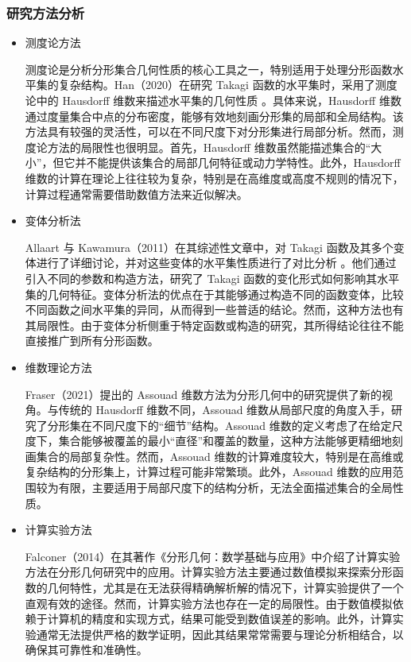 \subsubsection{研究方法分析}
\begin{itemize}


\item 测度论方法

测度论是分析分形集合几何性质的核心工具之一，特别适用于处理分形函数水平集的复杂结构。Han（2020）在研究 Takagi 函数的水平集时，采用了测度论中的 Hausdorff 维数来描述水平集的几何性质 \cite{1}。具体来说，Hausdorff 维数通过度量集合中点的分布密度，能够有效地刻画分形集的局部和全局结构。该方法具有较强的灵活性，可以在不同尺度下对分形集进行局部分析。然而，测度论方法的局限性也很明显。首先，Hausdorff 维数虽然能描述集合的“大小”，但它并不能提供该集合的局部几何特征或动力学特性。此外，Hausdorff 维数的计算在理论上往往较为复杂，特别是在高维度或高度不规则的情况下，计算过程通常需要借助数值方法来近似解决。
\item 变体分析法

Allaart 与 Kawamura（2011）在其综述性文章中，对 Takagi 函数及其多个变体进行了详细讨论，并对这些变体的水平集性质进行了对比分析 \cite{2}。他们通过引入不同的参数和构造方法，研究了 Takagi 函数的变化形式如何影响其水平集的几何特征。变体分析法的优点在于其能够通过构造不同的函数变体，比较不同函数之间水平集的异同，从而得到一些普适的结论。然而，这种方法也有其局限性。由于变体分析侧重于特定函数或构造的研究，其所得结论往往不能直接推广到所有分形函数。
\item 维数理论方法

Fraser（2021）提出的 Assouad 维数方法为分形几何中的研究提供了新的视角\cite{3}。与传统的 Hausdorff 维数不同，Assouad 维数从局部尺度的角度入手，研究了分形集在不同尺度下的“细节”结构。Assouad 维数的定义考虑了在给定尺度下，集合能够被覆盖的最小“直径”和覆盖的数量，这种方法能够更精细地刻画集合的局部复杂性。然而，Assouad 维数的计算难度较大，特别是在高维或复杂结构的分形集上，计算过程可能非常繁琐。此外，Assouad 维数的应用范围较为有限，主要适用于局部尺度下的结构分析，无法全面描述集合的全局性质。
\item 计算实验方法

Falconer（2014）在其著作《分形几何：数学基础与应用》中介绍了计算实验方法在分形几何研究中的应用\cite{4}。计算实验方法主要通过数值模拟来探索分形函数的几何特性，尤其是在无法获得精确解析解的情况下，计算实验提供了一个直观有效的途径。然而，计算实验方法也存在一定的局限性。由于数值模拟依赖于计算机的精度和实现方式，结果可能受到数值误差的影响。此外，计算实验通常无法提供严格的数学证明，因此其结果常常需要与理论分析相结合，以确保其可靠性和准确性。
\end{itemize}
